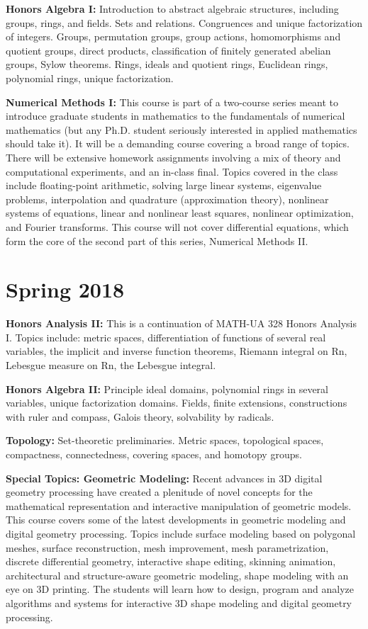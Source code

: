 \documentclass[11pt]{article}
\begin{document}
{\bf Honors Algebra I:} Introduction to abstract algebraic structures, including
groups, rings, and fields. Sets and relations. Congruences and unique
factorization of integers. Groups, permutation groups, group actions,
homomorphisms and quotient groups, direct products, classification of finitely
generated abelian groups, Sylow theorems. Rings, ideals and quotient rings,
Euclidean rings, polynomial rings, unique factorization.

{\bf Numerical Methods I:} This course is part of a two-course series meant to
introduce graduate students in mathematics to the fundamentals of numerical
mathematics (but any Ph.D. student seriously interested in applied mathematics
should take it). It will be a demanding course covering a broad range of topics.
There will be extensive homework assignments involving a mix of theory and
computational experiments, and an in-class final. Topics covered in the class
include floating-point arithmetic, solving large linear systems, eigenvalue
problems, interpolation and quadrature (approximation theory), nonlinear systems
of equations, linear and nonlinear least squares, nonlinear optimization, and
Fourier transforms. This course will not cover differential equations, which
form the core of the second part of this series, Numerical Methods II.

\section*{Spring 2018}

{\bf Honors Analysis II:} This is a continuation of MATH-UA 328 Honors Analysis
I. Topics include: metric spaces, differentiation of functions of several real
variables, the implicit and inverse function theorems, Riemann integral on Rn,
Lebesgue measure on Rn, the Lebesgue integral.

{\bf Honors Algebra II:} Principle ideal domains, polynomial rings in several
variables, unique factorization domains. Fields, finite extensions,
constructions with ruler and compass, Galois theory, solvability by radicals.

{\bf Topology:} Set-theoretic preliminaries. Metric spaces, topological spaces,
compactness, connectedness, covering spaces, and homotopy groups.

{\bf Special Topics: Geometric Modeling:} Recent advances in 3D digital geometry
processing have created a plenitude of novel concepts for the mathematical
representation and interactive manipulation of geometric models. This course
covers some of the latest developments in geometric modeling and digital
geometry processing. Topics include surface modeling based on polygonal meshes,
surface reconstruction, mesh improvement, mesh parametrization, discrete
differential geometry, interactive shape editing, skinning animation,
architectural and structure-aware geometric modeling, shape modeling with an eye
on 3D printing.  The students will learn how to design, program and analyze
algorithms and systems for interactive 3D shape modeling and digital geometry
processing.
\end{document}
